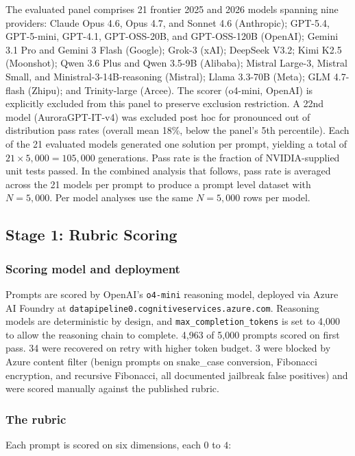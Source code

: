 \documentclass[conference]{IEEEtran}
\begin{document}
The evaluated panel comprises 21 frontier 2025 and 2026 models spanning nine providers: Claude Opus 4.6, Opus 4.7, and Sonnet 4.6 (Anthropic); GPT-5.4, GPT-5-mini, GPT-4.1, GPT-OSS-20B, and GPT-OSS-120B (OpenAI); Gemini 3.1 Pro and Gemini 3 Flash (Google); Grok-3 (xAI); DeepSeek V3.2; Kimi K2.5 (Moonshot); Qwen 3.6 Plus and Qwen 3.5-9B (Alibaba); Mistral Large-3, Mistral Small, and Ministral-3-14B-reasoning (Mistral); Llama 3.3-70B (Meta); GLM 4.7-flash (Zhipu); and Trinity-large (Arcee). The scorer (o4-mini, OpenAI) is explicitly excluded from this panel to preserve exclusion restriction. A 22nd model (AuroraGPT-IT-v4) was excluded post hoc for pronounced out of distribution pass rates (overall mean 18\%, below the panel's 5th percentile). Each of the 21 evaluated models generated one solution per prompt, yielding a total of $21 \times 5{,}000 = 105{,}000$ generations. Pass rate is the fraction of NVIDIA-supplied unit tests passed. In the combined analysis that follows, pass rate is averaged across the 21 models per prompt to produce a prompt level dataset with $N=5{,}000$. Per model analyses use the same $N=5{,}000$ rows per model.

\subsection{Stage 1: Rubric Scoring}

\subsubsection{Scoring model and deployment}
Prompts are scored by OpenAI's \texttt{o4-mini} reasoning model, deployed via Azure AI Foundry at \texttt{datapipeline0.cognitiveservices.azure.com}. Reasoning models are deterministic by design, and \texttt{max\_completion\_tokens} is set to 4{,}000 to allow the reasoning chain to complete. 4{,}963 of 5{,}000 prompts scored on first pass. 34 were recovered on retry with higher token budget. 3 were blocked by Azure content filter (benign prompts on snake\_case conversion, Fibonacci encryption, and recursive Fibonacci, all documented jailbreak false positives) and were scored manually against the published rubric.

\subsubsection{The rubric}
Each prompt is scored on six dimensions, each $0$ to $4$:
\end{document}
